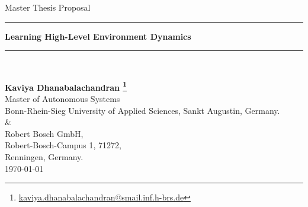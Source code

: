 \documentclass[12pt]{article}
\newcommand{\HRule}{\rule{\linewidth}{0.6mm}}
\begin{document}
\begin{titlepage}


\center %
 

\Large{Master Thesis Proposal}\\[1.5cm] 
\HRule
{ \Large \bfseries Learning High-Level Environment Dynamics}\\\HRule \\[0.4cm]

\vspace*{1.5\baselineskip}
 
\normalsize{\bfseries Kaviya Dhanabalachandran
\footnote{\href{kaviya.dhanabalachandran@smail.inf.h-brs.de}{kaviya.dhanabalachandran@smail.inf.h-brs.de}}}\\[0.25cm]
{\normalsize Master of Autonomous Systems}\\[0.5cm] %
{\small Bonn-Rhein-Sieg University of Applied Sciences, Sankt
Augustin, Germany.}\\[0.05cm]
\&
\\[0.05cm]
{\small Robert Bosch GmbH,\\ Robert-Bosch-Campus 1, 71272,\\ Renningen, Germany.}\\[0.7cm]
\small{\today}\\[1,5cm]



\end{titlepage}
\end{document}
